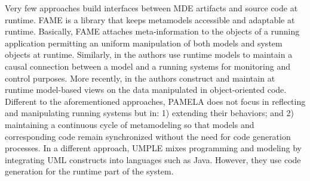 Very few approaches build interfaces between MDE artifacts and source code at runtime. FAME \cite{kuhn2008fame} is  a library that keeps metamodels accessible and adaptable at runtime. Basically, FAME attaches meta-information to the objects of a running application permitting an uniform manipulation of both models and system objects at runtime. Similarly, in \cite{song2010applying} the authors use runtime models to maintain a causal connection between a model and a running systems for monitoring and control purposes. More recently, in \cite{boronat2019} the authors construct and maintain at runtime model-based views on the data manipulated in object-oriented code. Different to the aforementioned approaches, PAMELA does not focus in reflecting and manipulating running systems but in: 1) extending their behaviors; and 2) maintaining a continuous cycle of metamodeling so that models and corresponding code remain synchronized without the need for code generation processes. In a different approach, UMPLE \cite{lethbridge2016merging} mixes programming and modeling by integrating UML constructs into languages such as Java. However, they use code generation for the runtime part of the system.
